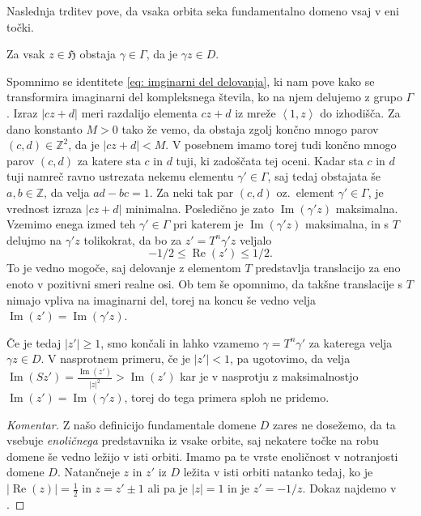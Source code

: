 \documentclass[mat1]{fmfdelo}
\numberwithin{equation}{section}
\newcommand{\Z}{\mathbb Z}
\newcommand{\HH}{\mathfrak{H}}
\newcommand{\SL}{\Gamma}
\newcommand{\abs}[1]{\left\lvert #1 \right\rvert}
\newcommand{\lattice}[2]{\left\langle #1, #2 \right\rangle}
\renewcommand\Re{\operatorname{Re}}%
\renewcommand\Im{\operatorname{Im}}%
\newcommand{\oz}{oz.\ }
\theoremstyle{definition}
\newenvironment{komentar}[1][Komentar]{\begin{proof}[#1]\let\qed\relax}{\end{proof}}
\begin{document}
Naslednja trditev pove, da vsaka orbita seka fundamentalno domeno vsaj v eni točki.

\begin{trditev}
    \label{predstavnik fundamentalne domene}
    Za vsak $z \in \HH$ obstaja $\gamma \in \SL$, da je $\gamma z \in D$.
\end{trditev}

\begin{dokaz}
    Spomnimo se identitete \eqref{eq: imginarni del delovanja}, ki nam pove kako se transformira imaginarni del kompleksnega števila, ko na njem delujemo z grupo $\SL$. Izraz $\abs{cz + d}$ meri razdalijo elementa $cz + d$ iz mreže $\lattice{1}{z}$ do izhodišča. Za dano konstanto $M > 0$ tako že vemo, da obstaja zgolj končno mnogo parov $(c,d) \in \Z^2$, da je $\abs{cz + d} < M$. V posebnem imamo torej tudi končno mnogo parov $(c,d)$ za katere sta $c$ in $d$ tuji, ki zadoščata tej oceni. Kadar sta $c$ in $d$ tuji namreč ravno ustrezata nekemu elementu $\gamma' \in \SL$, saj tedaj obstajata še $a,b \in \Z$, da velja $ad - bc = 1$. Za neki tak par $(c,d)$ \oz element $\gamma' \in \SL$, je vrednost izraza $\abs{cz + d}$ minimalna. Posledično je zato $\Im(\gamma' z)$ maksimalna.
    Vzemimo enega izmed teh $\gamma' \in \SL$ pri katerem je $\Im(\gamma'z)$ maksimalna, in s $T$ delujmo na $\gamma'z$ tolikokrat, da bo za $z' = T^n\gamma'z$ veljalo
    \[
        -1/2 \leq \Re(z') \leq 1/2.
    \]
    To je vedno mogoče, saj delovanje z elementom $T$ predstavlja translacijo za eno enoto v pozitivni smeri realne osi. Ob tem še opomnimo, da takšne translacije s $T$ nimajo vpliva na imaginarni del, torej na koncu še vedno velja $\Im(z') = \Im(\gamma'z)$. 

    Če je tedaj $\abs{z'} \geq 1$, smo končali in lahko vzamemo $\gamma = T^n\gamma'$ za katerega velja $\gamma z\in D$. V nasprotnem primeru, če je $\abs{z'} < 1$, pa ugotovimo, da velja $\Im(Sz') = \frac{\Im(z')}{\abs{z}^2} > \Im(z')$
    kar je v nasprotju z maksimalnostjo $\Im(z') = \Im(\gamma'z)$, torej do tega primera sploh ne pridemo.
\end{dokaz}


\begin{komentar}
    Z našo definicijo fundamentale domene $D$ zares ne dosežemo, da ta vsebuje \emph{enoličnega} predstavnika iz vsake orbite, saj nekatere točke na robu domene še vedno ležijo v isti orbiti. Imamo pa te vrste enoličnost v notranjosti domene $D$.
    Natančneje $z$ in $z'$ iz $D$ ležita v isti orbiti natanko tedaj, ko je $\abs{\Re(z)} = \frac12$ in $z = z' \pm 1$ ali pa je $\abs{z} = 1$ in je $z' = -1/z$. Dokaz najdemo v \cite[Izrek 1, VII, \S1]{Serre}.
\end{komentar}
\end{document}
